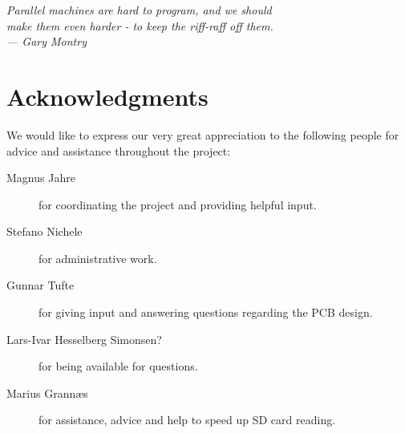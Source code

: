 
\begin{flushright}{\slshape
    Parallel machines are hard to program, and we should\\
    make them even harder - to keep the riff-raff off them.\\ \medskip
    ---  Gary Montry}  %
\end{flushright}

\bigskip

\begingroup
\let\clearpage\relax
\let\cleardoublepage\relax
\let\cleardoublepage\relax
\chapter*{Acknowledgments}
\bigskip

We would like to express our very great appreciation to the following people for
advice and assistance throughout the project:

\begin{description} %
\item[Magnus Jahre] for coordinating the project and providing helpful input.
\item[Stefano Nichele] for administrative work. 
\item[Gunnar Tufte] for giving input and answering questions regarding the PCB
design.
\item[Lars-Ivar Hesselberg Simonsen?] for being available for questions.
\item[Marius Grann{\ae}s] for assistance, advice and help to speed up SD
card reading.
\end{description}
\endgroup
